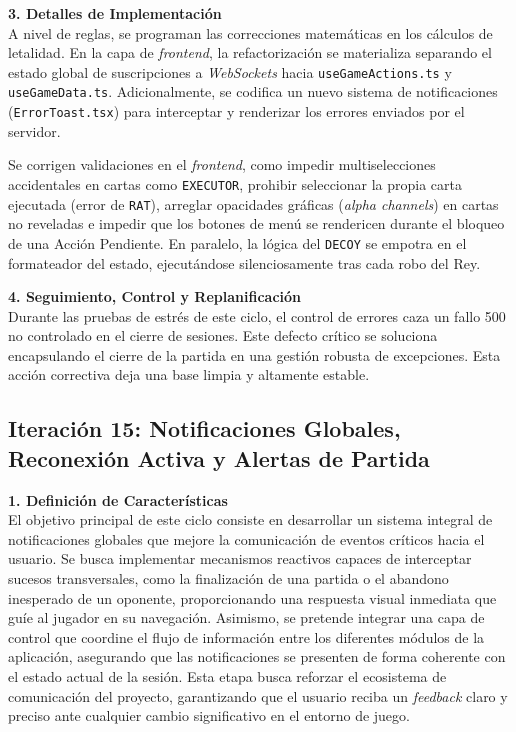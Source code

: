 \textbf{3. Detalles de Implementación} \\
A nivel de reglas, se programan las correcciones matemáticas en los cálculos de letalidad. En la capa de \textit{frontend}, la refactorización se materializa separando el estado global de suscripciones a \textit{WebSockets} hacia \texttt{useGameActions.ts} y \texttt{useGameData.ts}. Adicionalmente, se codifica un nuevo sistema de notificaciones (\texttt{ErrorToast.tsx}) para interceptar y renderizar los errores enviados por el servidor.

Se corrigen validaciones en el \textit{frontend}, como impedir multiselecciones accidentales en cartas como \texttt{EXECUTOR}, prohibir seleccionar la propia carta ejecutada (error de \texttt{RAT}), arreglar opacidades gráficas (\textit{alpha channels}) en cartas no reveladas e impedir que los botones de menú se rendericen durante el bloqueo de una Acción Pendiente. En paralelo, la lógica del \texttt{DECOY} se empotra en el formateador del estado, ejecutándose silenciosamente tras cada robo del Rey.

\textbf{4. Seguimiento, Control y Replanificación} \\
Durante las pruebas de estrés de este ciclo, el control de errores caza un fallo 500 no controlado en el cierre de sesiones. Este defecto crítico se soluciona encapsulando el cierre de la partida en una gestión robusta de excepciones. Esta acción correctiva deja una base limpia y altamente estable.

\subsection{Iteración 15: Notificaciones Globales, Reconexión Activa y Alertas de Partida}

\textbf{1. Definición de Características} \\
El objetivo principal de este ciclo consiste en desarrollar un sistema integral de notificaciones globales que mejore la comunicación de eventos críticos hacia el usuario. Se busca implementar mecanismos reactivos capaces de interceptar sucesos transversales, como la finalización de una partida o el abandono inesperado de un oponente, proporcionando una respuesta visual inmediata que guíe al jugador en su navegación. Asimismo, se pretende integrar una capa de control que coordine el flujo de información entre los diferentes módulos de la aplicación, asegurando que las notificaciones se presenten de forma coherente con el estado actual de la sesión. Esta etapa busca reforzar el ecosistema de comunicación del proyecto, garantizando que el usuario reciba un \textit{feedback} claro y preciso ante cualquier cambio significativo en el entorno de juego.

